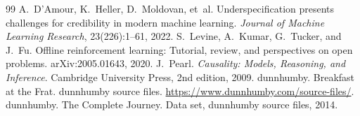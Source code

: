 \begin{thebibliography}{99}
 A.~D'Amour, K.~Heller, D.~Moldovan, et~al. Underspecification presents challenges for credibility in modern machine learning. \emph{Journal of Machine Learning Research}, 23(226):1--61, 2022.
 S.~Levine, A.~Kumar, G.~Tucker, and J.~Fu. Offline reinforcement learning: Tutorial, review, and perspectives on open problems. arXiv:2005.01643, 2020.
 J.~Pearl. \emph{Causality: Models, Reasoning, and Inference}. Cambridge University Press, 2nd edition, 2009.
 dunnhumby. Breakfast at the Frat. dunnhumby source files. \url{https://www.dunnhumby.com/source-files/}.
 dunnhumby. The Complete Journey. Data set, dunnhumby source files, 2014.
\end{thebibliography}
